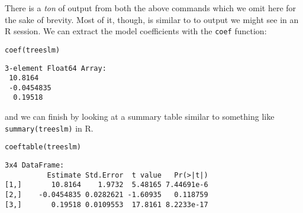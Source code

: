 \documentclass[11pt]{article}
\begin{document}
There is a \emph{ton} of output from both the above commands which we omit
here for the sake of brevity.  Most of it, though, is similar to to
output we might see in an R session.  We can extract the model
coefficients with the \texttt{coef} function:

\begin{verbatim}
coef(treeslm)
\end{verbatim}

\begin{verbatim}
3-element Float64 Array:
 10.8164   
 -0.0454835
  0.19518
\end{verbatim}

and we can finish by looking at a summary table similar to something
like \texttt{summary(treeslm)} in R.

\begin{verbatim}
coeftable(treeslm)
\end{verbatim}

\begin{verbatim}
3x4 DataFrame:
          Estimate Std.Error  t value   Pr(>|t|)
[1,]       10.8164    1.9732  5.48165 7.44691e-6
[2,]    -0.0454835 0.0282621 -1.60935   0.118759
[3,]       0.19518 0.0109553  17.8161 8.2233e-17
\end{verbatim}
\end{document}
